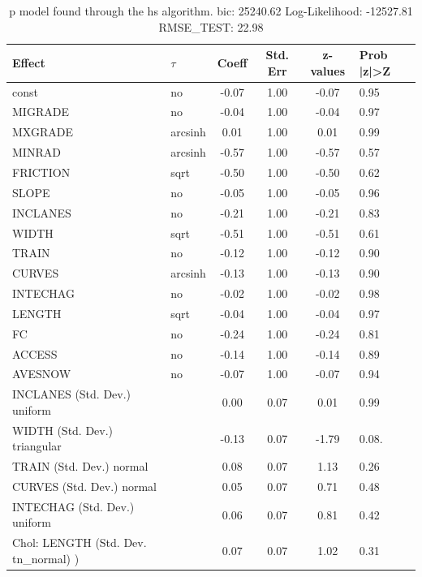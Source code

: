 \begin{table}
	\caption{p model found through the hs algorithm. bic: 25240.62 Log-Likelihood: -12527.81 RMSE_TEST: 22.98}
	\begin{center}
		\begin{tabular}{|l|l|c|c|c|l|}
			\hline
			Effect & $\tau$ & Coeff & Std. Err & z-values & Prob |z|>Z \\
			\hline
			const & no & -0.07 & 1.00 & -0.07 & 0.95 \\
			\hline
			MIGRADE & no & -0.04 & 1.00 & -0.04 & 0.97 \\
			\hline
			MXGRADE & arcsinh & 0.01 & 1.00 & 0.01 & 0.99 \\
			\hline
			MINRAD & arcsinh & -0.57 & 1.00 & -0.57 & 0.57 \\
			\hline
			FRICTION & sqrt & -0.50 & 1.00 & -0.50 & 0.62 \\
			\hline
			SLOPE & no & -0.05 & 1.00 & -0.05 & 0.96 \\
			\hline
			INCLANES & no & -0.21 & 1.00 & -0.21 & 0.83 \\
			\hline
			WIDTH & sqrt & -0.51 & 1.00 & -0.51 & 0.61 \\
			\hline
			TRAIN & no & -0.12 & 1.00 & -0.12 & 0.90 \\
			\hline
			CURVES & arcsinh & -0.13 & 1.00 & -0.13 & 0.90 \\
			\hline
			INTECHAG & no & -0.02 & 1.00 & -0.02 & 0.98 \\
			\hline
			LENGTH & sqrt & -0.04 & 1.00 & -0.04 & 0.97 \\
			\hline
			FC & no & -0.24 & 1.00 & -0.24 & 0.81 \\
			\hline
			ACCESS & no & -0.14 & 1.00 & -0.14 & 0.89 \\
			\hline
			AVESNOW & no & -0.07 & 1.00 & -0.07 & 0.94 \\
			\hline
			INCLANES (Std. Dev.) uniform &  & 0.00 & 0.07 & 0.01 & 0.99 \\
			\hline
			WIDTH (Std. Dev.) triangular &  & -0.13 & 0.07 & -1.79 & 0.08. \\
			\hline
			TRAIN (Std. Dev.) normal &  & 0.08 & 0.07 & 1.13 & 0.26 \\
			\hline
			CURVES (Std. Dev.) normal &  & 0.05 & 0.07 & 0.71 & 0.48 \\
			\hline
			INTECHAG (Std. Dev.) uniform &  & 0.06 & 0.07 & 0.81 & 0.42 \\
			\hline
			 Chol: LENGTH (Std. Dev. tn_normal) ) &  & 0.07 & 0.07 & 1.02 & 0.31 \\
			\hline

\end{tabular}
\end{center}
\end{table}
